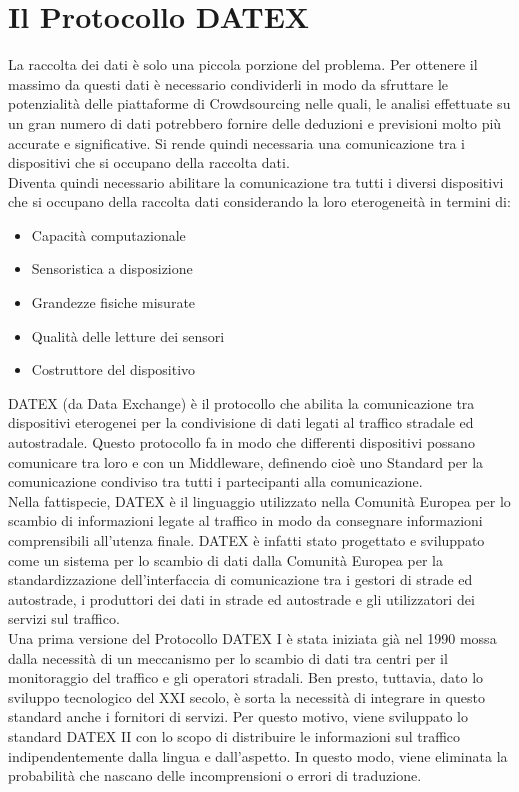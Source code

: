 \section{Il Protocollo DATEX}
La raccolta dei dati è solo una piccola porzione del problema. Per ottenere il massimo da questi dati è necessario condividerli in modo da sfruttare le potenzialità delle piattaforme di Crowdsourcing nelle quali, le analisi effettuate su un gran numero di dati potrebbero fornire delle deduzioni e previsioni molto più accurate e significative.
Si rende quindi necessaria una comunicazione tra i dispositivi che si occupano della raccolta dati.\\
Diventa quindi necessario abilitare la comunicazione tra tutti i diversi dispositivi che si occupano della raccolta dati considerando la loro eterogeneità in termini di:
\begin{itemize}
	\item Capacità computazionale
	\item Sensoristica a disposizione
	\item Grandezze fisiche misurate
	\item Qualità delle letture dei sensori
	\item Costruttore del dispositivo
\end{itemize}
DATEX (da Data Exchange) è il protocollo che abilita la comunicazione tra dispositivi eterogenei per la condivisione di dati legati al traffico stradale ed autostradale. Questo protocollo fa in modo che differenti dispositivi possano comunicare tra loro e con un Middleware, definendo cioè uno Standard per la comunicazione condiviso tra tutti i partecipanti alla comunicazione.\\
Nella fattispecie, DATEX è il linguaggio utilizzato nella Comunità Europea per lo scambio di informazioni legate al traffico in modo da consegnare informazioni comprensibili all'utenza finale. DATEX è infatti stato progettato e sviluppato come un sistema per lo scambio di dati dalla Comunità Europea per la standardizzazione dell'interfaccia di comunicazione tra i gestori di strade ed autostrade, i produttori dei dati in strade ed autostrade e gli utilizzatori dei servizi sul traffico. \cite{famous:paper_datexii}\\
Una prima versione del Protocollo DATEX I è stata iniziata già nel 1990 mossa dalla necessità di un meccanismo per lo scambio di dati tra centri per il monitoraggio del traffico e gli operatori stradali. Ben presto, tuttavia, dato lo sviluppo tecnologico del XXI secolo, è sorta la necessità di integrare in questo standard anche i fornitori di servizi. Per questo motivo, viene sviluppato lo standard DATEX II con lo scopo di distribuire le informazioni sul traffico indipendentemente dalla lingua e dall'aspetto. In questo modo, viene eliminata la probabilità che nascano delle incomprensioni o errori di traduzione.\\
